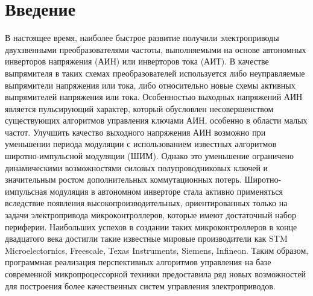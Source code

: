 \section*{Введение}
    В настоящее время, наиболее быстрое развитие получили электроприводы
    двухзвенными преобразователями частоты, выполняемыми на основе автономных
    инверторов напряжения (АИН) или инверторов тока (АИТ). В качестве
    выпрямителя в таких схемах преобразователей используется либо неуправляемые
    выпрямители напряжения или тока, либо относительно новые схемы активных
    выпрямителей напряжения или тока.  Особенностью выходных напряжений АИН
    является пульсирующий характер, который обусловлен несовершенством
    существующих алгоритмов управления ключами АИН, особенно в области малых
    частот.  Улучшить качество выходного напряжения АИН возможно при уменьшении
    периода модуляции с использованием известных алгоритмов широтно-импульсной
    модуляции (ШИМ). Однако это уменьшение ограничено динамическими
    возможностями силовых полупроводниковых ключей и значительным ростом
    дополнительных коммутационных потерь.  Широтно-импульсная модуляция в
    автономном инверторе стала активно применяться вследствие появления
    высокопроизводительных, ориентированных только на задачи электропривода
    микроконтроллеров, которые имеют достаточный набор периферии. Наибольших
    успехов в создании таких микроконтроллеров в конце двадцатого века достигли
    такие известные мировые производители как STM Microelectornics, Freescale,
    Texas Instruments, Siemens, Infineon. Таким образом, программная реализация
    перспективных алгоритмов управления на базе современной микропроцессорной
    техники предоставила ряд новых возможностей для построения более
    качественных систем управления электроприводов. 
